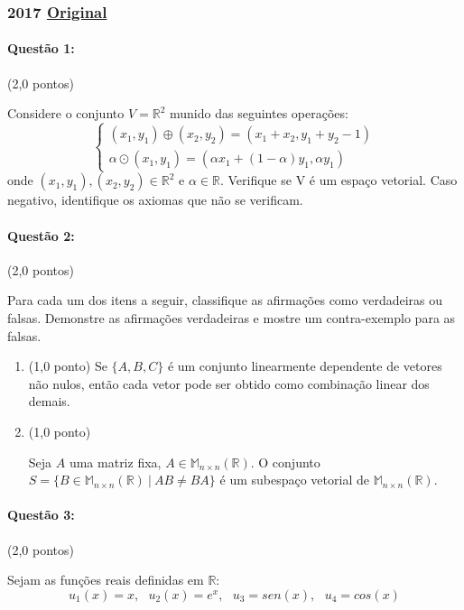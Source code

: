 \documentclass[12pt,a4paper]{article}
\newcommand{\original}[1]{\tiny \href{#1}{Original} \normalsize}
\begin{document}
\newpage

\subsubsection{2017 \original{https://drive.google.com/file/d/1IOoOK7V1SkLl35WRNMCb5YPvpzosOWC7/view?usp=sharing}}

\paragraph{Questão 1:} (2,0 pontos)

Considere o conjunto $V=\mathbb{R}^2$ munido das seguintes operações: 
$$\begin{cases}
(x_1,y_1) \oplus (x_2,y_2)=(x_1+x_2,y_1+y_2-1)\\
\alpha \odot (x_1,y_1) = (\alpha x_1 + (1-\alpha)y_1,\alpha y_1) 
\end{cases}$$
onde $(x_1,y_1),(x_2,y_2) \in \mathbb{R}^2$ e $\alpha \in \mathbb{R}$. Verifique se V é um espaço vetorial. Caso negativo, identifique os axiomas que não se verificam.

\paragraph{Questão 2:} (2,0 pontos)

Para cada um dos itens a seguir, classifique as afirmações como verdadeiras ou falsas. Demonstre as afirmações verdadeiras e mostre um contra-exemplo para as falsas.
\begin{enumerate}[label=(\alph*)]
\item (1,0 ponto) Se $\{A, B, C\}$ é um conjunto linearmente dependente de vetores não nulos, então cada vetor pode ser obtido como combinação linear dos demais.

\item (1,0 ponto)

Seja $A$ uma matriz fixa, $A\in \mathbb{M}_{n \times n}(\mathbb{R})$. O conjunto $S=\{B \in \mathbb{M}_{n \times n}(\mathbb{R}) \ | \ AB \neq BA\}$ é um subespaço vetorial de $\mathbb{M}_{n \times n}(\mathbb{R})$. 
\end{enumerate}

\paragraph{Questão 3:} (2,0 pontos)

Sejam as funções reais definidas em $\mathbb{R}$:
$$u_1(x)=x, \ \ \ u_2(x)=e^x, \ \ \ u_3=sen(x), \ \ \ u_4=cos(x) $$
\end{document}
